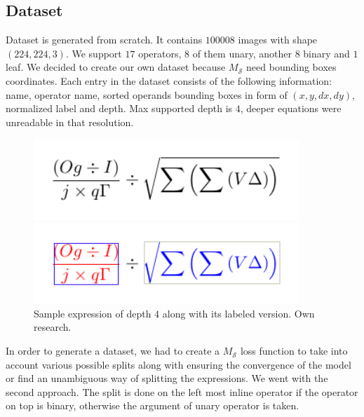 \documentclass{sciposter}
\begin{document}
\begin{multicols}{3}
\subsection{Dataset}
Dataset is generated from scratch. It contains $100008$ images with shape $(224,224,3)$. We support $17$ operators, $8$ of them unary, another $8$ binary and $1$ leaf. We decided to create our own dataset because $M_{\mathcal{S}}$ need bounding boxes coordinates. Each entry in the dataset consists of the following information: name, operator name, sorted operands bounding boxes in form of $(x,y,dx,dy)$, normalized label and depth. Max supported depth is $4$, deeper equations were unreadable in that resolution.

\begin{figure}[h]
\begin{center}
\includegraphics[width=10cm]{eq85004_b.png}
\end{center}
\begin{center}
\includegraphics[width=10cm]{eq85004_c.png}
\end{center}
\caption{ \label{fig:eigen} Sample expression of depth $4$ along with its labeled version.  Own research.}
\end{figure}

In order to generate a dataset, we had to create a $M_{\mathcal{S}}$ loss function to take into account various possible splits along with ensuring the convergence of the model or find an unambiguous way of splitting the expressions. We went with the second approach. The split is done on the left most inline operator if the operator on top is binary, otherwise the argument of unary operator is taken.


\end{multicols}
\end{document}
